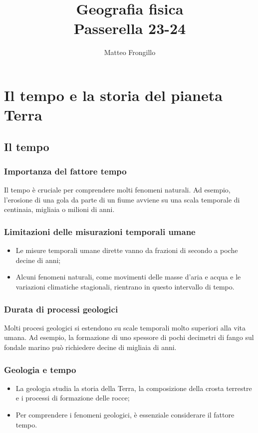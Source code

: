\documentclass{article}
\title{\textbf{Geografia fisica\\Passerella 23-24}}
\author{Matteo Frongillo}
\begin{document}
\maketitle
\tableofcontents

\newpage

\section{Il tempo e la storia del pianeta Terra}
\subsection{Il tempo}
\subsubsection{Importanza del fattore tempo}
Il tempo è cruciale per comprendere molti fenomeni naturali. Ad esempio, l'erosione di una gola
da parte di un fiume avviene su una scala temporale di centinaia, migliaia o milioni di anni.

\subsubsection{Limitazioni delle misurazioni temporali umane}
\begin{itemize}
    \item Le misure temporali umane dirette vanno da frazioni di secondo a poche decine di anni;
    \item Alcuni fenomeni naturali, come movimenti delle masse d'aria e acqua e le variazioni
        climatiche stagionali, rientrano in questo intervallo di tempo.
\end{itemize}

\subsubsection{Durata di processi geologici}
Molti procesi geologici si estendono su scale temporali molto superiori alla vita umana.
Ad esempio, la formazione di uno spessore di pochi decimetri di fango sul fondale marino può
richiedere decine di migliaia di anni.

\subsubsection{Geologia e tempo}
\begin{itemize}
    \item La geologia studia la storia della Terra, la composizione della crosta terrestre e i
        processi di formazione delle rocce;
    \item Per comprendere i fenomeni geologici, è essenziale considerare il fattore tempo.
\end{itemize}
\end{document}

